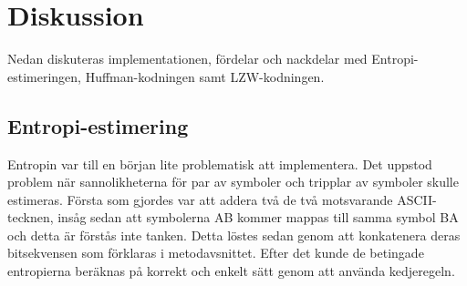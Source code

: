 
\chapter{Diskussion}
\label{cha:discussion}

Nedan diskuteras implementationen, fördelar och nackdelar med Entropi-estimeringen, Huffman-kodningen samt LZW-kodningen.

\section{Entropi-estimering}
Entropin var till en början lite problematisk att implementera. Det uppstod problem när sannolikheterna för par av symboler och tripplar av symboler skulle estimeras. Första som gjordes var att addera två de två motsvarande ASCII-tecknen, insåg sedan att symbolerna AB kommer mappas till samma symbol BA och detta är förstås inte tanken. Detta löstes sedan genom att konkatenera deras bitsekvensen som förklaras i metodavsnittet. Efter det kunde de betingade entropierna beräknas på korrekt och enkelt sätt genom att använda kedjeregeln.

